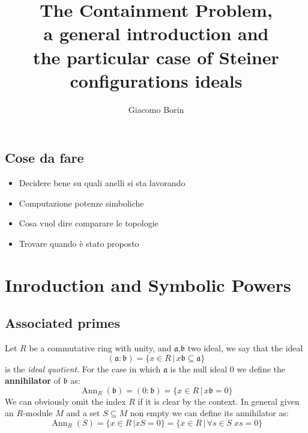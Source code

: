 \documentclass[]{book}
\title{The Containment Problem, 
\\a general introduction and 
\\the particular case of Steiner configurations ideals}
\author{Giacomo Borin}
\theoremstyle{plain}
\theoremstyle{remark}
\theoremstyle{definition}
\newcommand{\A}{\mathfrak{a}}
\newcommand{\B}{\mathfrak{b}}
\DeclareMathOperator{\Ann}{Ann}
\begin{document}
\frontmatter
\maketitle
\tableofcontents


\mainmatter

\section*{Cose da fare}
\begin{tcolorbox}
\begin{itemize}
\item Decidere bene su quali anelli si sta lavorando
\item Computazione potenze simboliche 
\item Cosa vuol dire comparare le topologie
\item Trovare quando è stato proposto 
\end{itemize}
\end{tcolorbox}


\chapter{Inroduction and Symbolic Powers}


\section{Associated primes}

Let $ R $ be a commutative ring with unity, and $ \A $,$ \B $ two ideal, we say that the ideal
\begin{equation*}
	(\A : \B) = \{ x \in R \,|\, x\B \subseteq \A  \}
\end{equation*}
 \nocite{AMCD}
is the \textit{ideal quotient}. For the case in which $ \A $  is the null ideal $ 0 $ we define the \textbf{annihilator} of $ \B $ as:
\begin{equation*}
	\Ann_R(\B) = (0 : \B) = \{ x \in R \,|\, x\B = 0  \}
\end{equation*}
We can obviously omit the index $ R $ if it is clear by the context. In general given an $ R  $-module $ M $ and a set $ S \subseteq M $ non empty we can define its annihilator as:
\begin{equation*}
	\Ann_R (S) = \{ x \in R \,| xS = 0  \} = \{ x \in R \,|\, \forall s \in S \; xs = 0  \}
\end{equation*}
\end{document}
